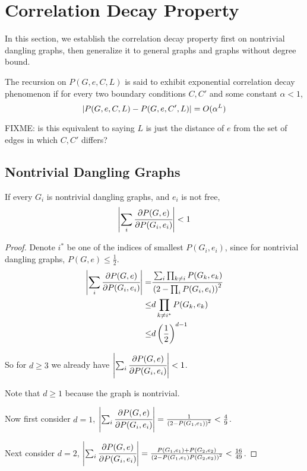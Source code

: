 \section{Correlation Decay Property}
In this section, we establish the correlation decay property first on nontrivial dangling graphs, then generalize it to general graphs and graphs without degree bound.

\begin{Def}
	The recursion on $P(G,e, C, L)$ is said to exhibit exponential correlation decay phenomenon if for every two boundary conditions $C, C'$ and some constant $\alpha <1$,
	\[\left\vert P(G,e,C,L) - P(G,e,C',L)\right\vert = O(\alpha ^L)\]
\end{Def}

FIXME: is this equivalent to saying $L$ is just the distance of $e$ from the set of edges in which $C,C'$ differs?


	\subsection{Nontrivial Dangling Graphs}
	\begin{Prop}
		If every $G_i$ is nontrivial dangling graphs, and $e_i$ is not free, 
		\begin{align*}
			\left\vert\sum_i \cfrac{\partial P(G,e)}{\partial P(G_i,e_i)}\right\vert < 1 
		\end{align*}
	\end{Prop}

	\begin{proof}
		Denote $i^*$ be one of the indices of smallest $P(G_i, e_i)$, since for nontrivial dangling graphs, $P(G,e) \leq \frac{1}{2}$.
	\begin{align*}
		\left\vert\sum_i \cfrac{\partial P(G,e)}{\partial P(G_i,e_i)}\right\vert  =& \cfrac{\sum_i \prod_{k \neq i} P(G_k, e_k)  }{\left( 2 - \prod_i P(G_i, e_i) \right)^2} \\
		\leq & d \prod_{k \neq i^*} P(G_k, e_k) \\
		\leq & d \left( \frac{1}{2} \right)^{d-1}
	\end{align*}

	So for $d \geq 3$ we already have $\left\vert\sum_i \cfrac{\partial P(G,e)}{\partial P(G_i,e_i)}\right\vert < 1$.

	Note that $d\geq 1$ because the graph is nontrivial.

	Now first consider $d=1$, $\left\vert\sum_i \cfrac{\partial P(G,e)}{\partial P(G_i,e_i)}\right\vert = \frac{1}{\left( 2 - P(G_1,e_1) \right)^2} < \frac{4}{9} $.

	Next consider $d=2$,  $\left\vert\sum_i \cfrac{\partial P(G,e)}{\partial P(G_i,e_i)}\right\vert = \frac{P(G_1,e_1) + P(G_2,e_2)}{\left( 2 - P(G_1,e_1)P(G_2,e_2) \right)^2} < \frac{16}{49} $.
	\end{proof}

